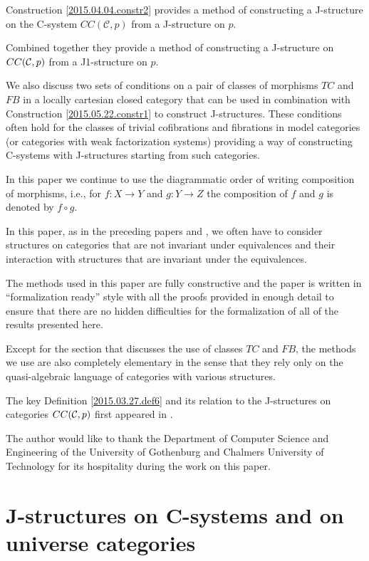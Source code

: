 \documentclass[12pt]{article}
\numberwithin{equation}{section}
\newcommand{\sr}{\rightarrow}
\newcommand{\toCC}{CC} %
\begin{document}
Construction \ref{2015.04.04.constr2} provides a method of constructing a
J-structure on the C-system $\toCC({\mathcal C},p)$ from a J-structure on $p$.

Combined together they provide a method of constructing a J-structure on
$\toCC({\cal C},p)$ from a J1-structure on $p$.

We also discuss two sets of conditions on a pair of classes of morphisms $TC$
and $FB$ in a locally cartesian closed category that can be used in combination
with Construction \ref{2015.05.22.constr1} to construct J-structures. These
conditions often hold for the classes of trivial cofibrations and fibrations in
model categories (or categories with weak factorization systems) providing a
way of constructing C-systems with J-structures starting from such categories.

In this paper we continue to use the diagrammatic order of writing composition
of morphisms, i.e., for $f:X\sr Y$ and $g:Y\sr Z$ the composition of $f$ and
$g$ is denoted by $f\circ g$.

In this paper, as in the preceding papers \cite{Cfromauniverse} and
\cite{fromunivwithPi}, we often have to consider structures on categories that
are not invariant under equivalences and their interaction with structures that
are invariant under the equivalences.

The methods used in this paper are fully constructive and the paper is written
in ``formalization ready'' style with all the proofs provided in enough detail
to ensure that there are no hidden difficulties for the formalization of all of
the results presented here.

Except for the section that discusses the use of classes $TC$ and $FB$, the
methods we use are also completely elementary in the sense that they rely only
on the quasi-algebraic language of categories with various structures.

The key Definition \ref{2015.03.27.def6} and its relation to the J-structures
on categories $\toCC({\cal C},p)$ first appeared in \cite{CMUtalk}.

The author would like to thank the Department of Computer Science and
Engineering of the University of Gothenburg and Chalmers University of
Technology for its hospitality during the work on this paper.


\section{J-structures on C-systems and on universe categories}
\end{document}
